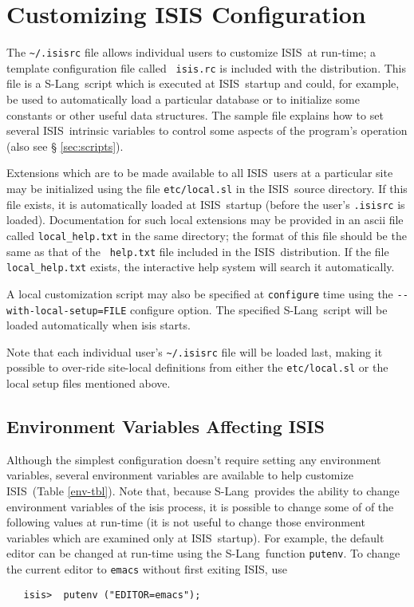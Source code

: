 \documentclass{book}
\newcommand{\isisx}{{\sc ISIS~}}
\newcommand{\isis}{{\sc ISIS}}
\newcommand{\slang}{{\sc S-Lang}}
\begin{document}
\chapter{Customizing ISIS Configuration}
\label{chap:custom}

The \verb|~/.isisrc| file allows individual users to customize
\isisx at run-time; a template configuration file called {\tt
isis.rc} is included with the distribution. This file is a \slang{}ript which is executed at \isisx startup and could, for example,
be used to automatically load a particular database or to
initialize some constants or other useful data structures. The
sample file explains how to set several \isisx intrinsic variables
to control some aspects of the program's operation (also see \S
\ref{sec:scripts}).

Extensions which are to be made
available to all \isisx users at a particular site may be
initialized using the file {\tt etc/local.sl} in the \isisx source
directory. If this file exists, it is automatically loaded at
\isisx startup (before the user's {\tt .isisrc} is loaded).
Documentation for such local extensions may be provided in an
ascii file called {\tt local\_help.txt} in the same directory; the
format of this file should be the same as that of the {\tt
help.txt} file included in the \isisx distribution.  If the file
{\tt local\_help.txt} exists, the interactive help system will
search it automatically.

A local customization script may also be specified at \verb|configure| time
using the \verb|--with-local-setup=FILE| configure option.  The
specified \slang{}ript will be loaded automatically when
isis starts.

Note that each individual user's \verb|~/.isisrc| file will be loaded last,
making it possible to over-ride site-local definitions from either the
\verb|etc/local.sl| or the local setup files mentioned above.

\section{Environment Variables Affecting ISIS}
\label{sec:env-var}

Although the simplest configuration doesn't require setting any
environment variables, several environment variables are available to
help customize \isisx (Table \ref{env-tbl}).  Note that, because \slang\
provides the ability to change environment variables of the isis process, it
is possible to change some of of the following values at run-time
(it is not useful to change those environment variables which are examined
only at \isisx startup).  For example, the default editor can be changed at
run-time using the \slang\ function {\tt putenv}.  To change the current
editor to {\tt emacs} without first exiting \isis, use
\begin{verbatim}
   isis>  putenv ("EDITOR=emacs");
\end{verbatim}
\end{document}
